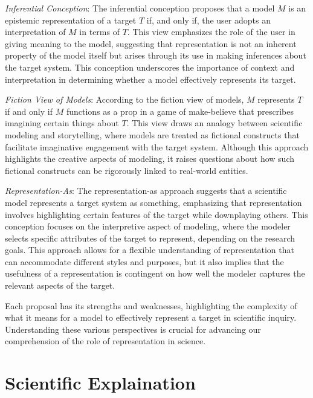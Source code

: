 \emph{Inferential Conception}: The inferential conception proposes that a model $M$ is an epistemic representation of a target $T$ if, and only if, the user adopts an interpretation of $M$ in terms of $T$. This view emphasizes the role of the user in giving meaning to the model, suggesting that representation is not an inherent property of the model itself but arises through its use in making inferences about the target system. This conception underscores the importance of context and interpretation in determining whether a model effectively represents its target.

\emph{Fiction View of Models}: According to the fiction view of models, $M$ represents $T$ if and only if $M$ functions as a prop in a game of make-believe that prescribes imagining certain things about $T$. This view draws an analogy between scientific modeling and storytelling, where models are treated as fictional constructs that facilitate imaginative engagement with the target system. Although this approach highlights the creative aspects of modeling, it raises questions about how such fictional constructs can be rigorously linked to real-world entities.

\emph{Representation-As}: The representation-as approach suggests that a scientific model represents a target system as something, emphasizing that representation involves highlighting certain features of the target while downplaying others. This conception focuses on the interpretive aspect of modeling, where the modeler selects specific attributes of the target to represent, depending on the research goals. This approach allows for a flexible understanding of representation that can accommodate different styles and purposes, but it also implies that the usefulness of a representation is contingent on how well the modeler captures the relevant aspects of the target.

Each proposal has its strengths and weaknesses, highlighting the complexity of what it means for a model to effectively represent a target in scientific inquiry. Understanding these various perspectives is crucial for advancing our comprehension of the role of representation in science.


%
%

\section{Scientific Explaination}

